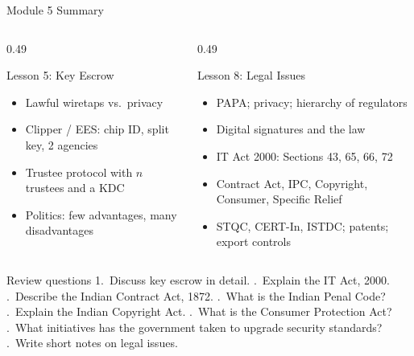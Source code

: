 \documentclass[aspectratio=169,11pt,xcolor={table}]{beamer}
\begin{document}
\begin{frame}{Module 5 Summary}
  \begin{columns}[T]
    \begin{column}{0.49\textwidth}
      \begin{block}{Lesson 5: Key Escrow}
        \small
        \begin{itemize}\setlength{\itemsep}{0pt}
          \item Lawful wiretaps vs.\ privacy
          \item Clipper / EES: chip ID, split key, 2 agencies
          \item Trustee protocol with $n$ trustees and a KDC
          \item Politics: few advantages, many disadvantages
        \end{itemize}
      \end{block}
    \end{column}
    \begin{column}{0.49\textwidth}
      \begin{exampleblock}{Lesson 8: Legal Issues}
        \small
        \begin{itemize}\setlength{\itemsep}{0pt}
          \item PAPA; privacy; hierarchy of regulators
          \item Digital signatures and the law
          \item IT Act 2000: Sections 43, 65, 66, 72
          \item Contract Act, IPC, Copyright, Consumer, Specific Relief
          \item STQC, CERT-In, ISTDC; patents; export controls
        \end{itemize}
      \end{exampleblock}
    \end{column}
  \end{columns}
  \vspace{1mm}
  \begin{alertblock}{Review questions}
    \scriptsize
    1.~Discuss key escrow in detail. .~Explain the IT Act, 2000. .~Describe the Indian Contract Act, 1872. .~What is the Indian Penal Code? .~Explain the Indian Copyright Act. .~What is the Consumer Protection Act? .~What initiatives has the government taken to upgrade security standards? .~Write short notes on legal issues.
  \end{alertblock}
\end{frame}
\end{document}
